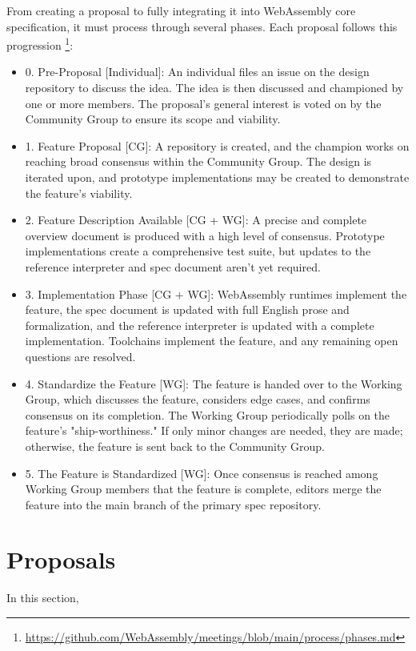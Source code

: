 From creating a proposal to fully integrating it into WebAssembly core specification, it must process through several phases. Each proposal follows this progression \footnote{\url{https://github.com/WebAssembly/meetings/blob/main/process/phases.md}}:
\begin{itemize}
  \item 0. Pre-Proposal [Individual]: An individual files an issue on the design repository to discuss the idea. The idea is then discussed and championed by one or more members. The proposal's general interest is voted on by the Community Group to ensure its scope and viability.
  \item 1. Feature Proposal [CG]: A repository is created, and the champion works on reaching broad consensus within the Community Group. The design is iterated upon, and prototype implementations may be created to demonstrate the feature's viability.
  \item 2. Feature Description Available [CG + WG]: A precise and complete overview document is produced with a high level of consensus. Prototype implementations create a comprehensive test suite, but updates to the reference interpreter and spec document aren't yet required.
  \item 3. Implementation Phase [CG + WG]: WebAssembly runtimes implement the feature, the spec document is updated with full English prose and formalization, and the reference interpreter is updated with a complete implementation. Toolchains implement the feature, and any remaining open questions are resolved.
  \item 4. Standardize the Feature [WG]: The feature is handed over to the Working Group, which discusses the feature, considers edge cases, and confirms consensus on its completion. The Working Group periodically polls on the feature's "ship-worthiness." If only minor changes are needed, they are made; otherwise, the feature is sent back to the Community Group.
  \item 5. The Feature is Standardized [WG]: Once consensus is reached among Working Group members that the feature is complete, editors merge the feature into the main branch of the primary spec repository.
\end{itemize}


\section{Proposals}
\label{sec:proposals}
In this section, 

